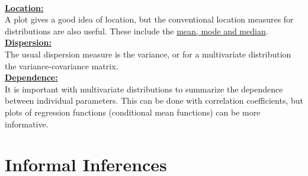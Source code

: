 \documentclass[lecture,12pt,]{pcms-l}
\numberwithin{section}{chapter}
\numberwithin{equation}{chapter}
\theoremstyle{plain}
\theoremstyle{definition}
\theoremstyle{definition}
\begin{document}
\\
\underline{\bf{Location:}}
\\
A plot gives a good idea of location, but the conventional location measures for distributions are also useful. These include the \underline{mean, mode and median}.
\\
\underline{\bf{Dispersion:}}
\\
The usual dispersion measure is the variance, or for a multivariate distribution the variance-covariance matrix.
\\
\underline{\bf{Dependence:}}
\\
It is important with multivariate distributions to summarize the dependence between individual parameters. This can be done with correlation coefficients, but plots of regression functions (conditional mean functions) can be more informative.
\section{Informal Inferences}
\end{document}
